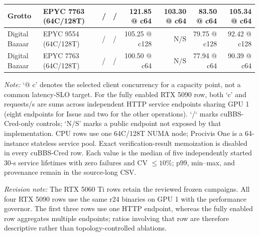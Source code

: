 \begin{table}[t]
{\begin{tabular}{llllrrrr}
\midrule
Grotto & EPYC 7763 (64C/128T) & / & / & 121.85 @ c64 & 103.30 @ c64 & 83.50 @ c64 & 105.34 @ c64 \\
\midrule
Digital Bazaar & EPYC 9554 (64C/128T) & / & / & 105.25 @ c128 & N/S & 79.75 @ c128 & 92.42 @ c128 \\
\midrule
Digital Bazaar & EPYC 7763 (64C/128T) & / & / & 100.50 @ c64 & N/S & 77.94 @ c64 & 90.39 @ c64 \\
\bottomrule
\end{tabular}%
}
\begin{minipage}{\textwidth}\footnotesize\textit{Note:} `@ c' denotes the selected client concurrency for a capacity point, not a common latency-SLO target. For the fully enabled RTX 5090 row, both `c' and requests/s are sums across independent HTTP service endpoints sharing GPU 1 (eight endpoints for Issue and two for the other operations). `/` marks cuBBS-Cred-only controls; `N/S' marks a public endpoint not exposed by that implementation. CPU rows use one 64C/128T NUMA node; Procivis One is a 64-instance stateless service pool. Exact verification-result memoization is disabled in every cuBBS-Cred row. Each value is the median of five independently started 30-s service lifetimes with zero failures and CV $\leq 10\%$; p99, min--max, and provenance remain in the source-long CSV.\end{minipage}
\par\footnotesize\textit{Revision note:} The RTX 5060 Ti rows retain the reviewed frozen campaigns. All four RTX 5090 rows use the same r24 binaries on GPU 1 with the performance governor. The first three rows use one HTTP endpoint, whereas the fully enabled row aggregates multiple endpoints; ratios involving that row are therefore descriptive rather than topology-controlled ablations.
\end{table}

